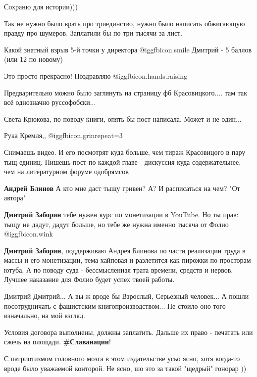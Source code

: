 \begin{itemize}
Сохраню для истории)))

Так не нужно было врать про триединство, нужно было написать обжигающую правду про шумеров. Заплатили бы по три тысячи за лист.

Какой знатный взрыв 5-й точки у директора  @igg{fbicon.smile} 
Дмитрий - 5 баллов (или 12 по новому)

Это просто прекрасно! Поздравляю  @igg{fbicon.hands.raising} 

Предварительно можно было заглянуть на страницу фб Красовицкого.... там так всё однозначно руссофобски...

Света Крюкова, по поводу книги, опять бы пост написала. Может и не один...

Рука Кремля,, @igg{fbicon.grin}{repeat=3} 


Снимаешь видео. И его посмотрят куда больше, чем тираж Красовицого в пару тыщ
единиц. Пишешь пост по каждой главе - дискуссия куда содержательнее, чем на
литературном форуме одобрямсов

\begin{itemize} %
\textbf{Андрей Блинов} А кто мне даст тыщу гривен? А? И расписаться на чем? "От автора"

\textbf{Дмитрий Заборин} тебе нужен курс по монетизации в YouTube. Но ты прав: тыщу не дадут, дадут больше, но тебе же нужна именно тысяча от Фолио  @igg{fbicon.wink} 

\textbf{Дмитрий Заборин}, поддерживаю Андрея Блинова по части реализации труда в массы и его монетизации, тема хайповая и разлетится как пирожки по просторам ютуба. А по поводу суда - бессмысленная трата времени, средств и нервов. Лучшее наказание для Фолио будет успех твоей работы.
\end{itemize} %

Дмитрий Дмитрий... А вы ж вроде бы Взрослый, Серьезный человек... А пошли посотрудничать с фашистским книгопроизводством... Не стоило оно того изначально, на мой взгляд.

Условия договора выполнены, должны заплатить.
Дальше их право - печатать или сжечь на площади.
\textbf{\#Славанации}!

С патриотизмом головного мозга в этом издательстве усьо ясно, хотя когда-то вроде было уважаемой конторой.
Не ясно, шо это за такой "щедрый" гонорар ))


\end{itemize}
